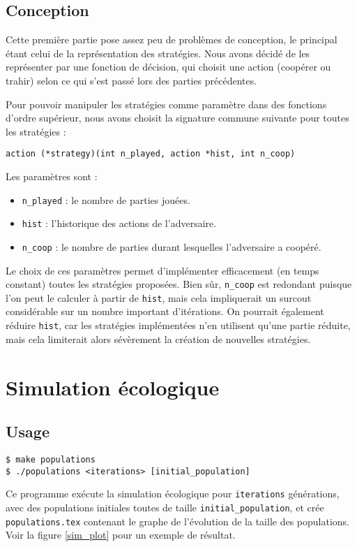 \documentclass[10pt]{article}
\begin{document}
\subsection{Conception}
Cette première partie pose assez peu de problèmes de conception, 
le principal étant celui de la représentation des stratégies.
Nous avons décidé de les représenter par une fonction de décision, qui choisit une action
(coopérer ou trahir) selon ce qui s'est passé lors des parties précédentes.

Pour pouvoir manipuler les stratégies comme paramètre dans des fonctions d'ordre supérieur, 
nous avons choisit la signature commune suivante pour toutes les stratégies :
\begin{verbatim}
action (*strategy)(int n_played, action *hist, int n_coop)
\end{verbatim}

Les paramètres sont :
\begin{itemize}
\item \verb|n_played| : le nombre de parties jouées.
\item \verb|hist| : l'historique des actions de l'adversaire.
\item \verb|n_coop| : le nombre de parties durant lesquelles l'adversaire a coopéré.
\end{itemize}
Le choix de ces paramètres permet d'implémenter efficacement (en temps constant)
toutes les stratégies proposées. Bien sûr, \verb|n_coop| est redondant puisque
l'on peut le calculer à partir de \verb|hist|, mais cela impliquerait un surcout
considérable sur un nombre important d'itérations.
On pourrait également réduire \verb|hist|, car les stratégies implémentées n'en
utilisent qu'une partie réduite, mais cela limiterait alors sévèrement la
création de nouvelles stratégies.


\section{Simulation écologique}
\subsection{Usage}
\begin{verbatim}
$ make populations
$ ./populations <iterations> [initial_population]
\end{verbatim}

Ce programme exécute la simulation écologique pour \verb|iterations| générations,
avec des populations initiales toutes de taille \verb|initial_population|,
et crée \verb|populations.tex| contenant le graphe de l'évolution de la taille des populations.
Voir la figure \ref{sim_plot} pour un exemple de résultat.
\end{document}
